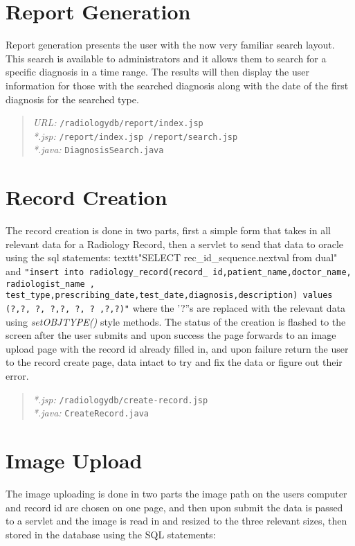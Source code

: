 \documentclass[12pt]{report}
\begin{document}
\section*{Report Generation}
Report generation presents the user with the now very familiar search layout. This search is available to administrators and it allows them to search for a specific diagnosis in a time range. The results will then display the user information for those with the searched diagnosis along with the date of the first diagnosis for the searched type.

\begin{quote}
\emph{URL:} \texttt{/radiologydb/report/index.jsp} \\
\emph{*.jsp: } \texttt{/report/index.jsp /report/search.jsp} \\
\emph{*.java: } \texttt{DiagnosisSearch.java}
\end{quote}

\section*{Record Creation}
The record creation is done in two parts, first a simple form that takes in all relevant data for a Radiology Record, then a servlet to send that data to oracle using the sql statements: texttt{"SELECT rec\_id\_sequence.nextval from dual"} and  \texttt{"insert into radiology\_record(record\_ id,patient\_name,doctor\_name, radiologist\_name , test\_type,prescribing\_date,test\_date,diagnosis,description) values (?,?, ?, ?,?, ?, ? ,?,?)"} where the '?''s are replaced with the relevant data using \emph{setOBJTYPE()} style methods.
The status of the creation is flashed to the screen after the user submits and upon success the page forwards to an image upload page with the record id already filled in, and upon failure return the user to the record create page, data intact to try and fix the data or figure out their error.  

\begin{quote}
\emph{*.jsp:} \texttt{/radiologydb/create-record.jsp} \\
\emph{*.java: } \texttt{CreateRecord.java}
\end{quote}



\section*{Image Upload}
The image uploading is done in two parts the image path on the users computer and record id are chosen on one page, and then upon submit the data is passed to a servlet and the image is read in and resized to the three relevant sizes, then stored in the database using the SQL statements:\\
        
\end{document}

